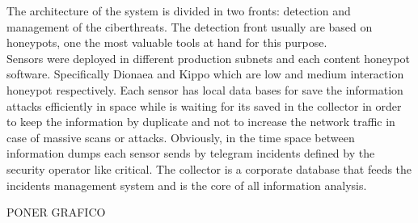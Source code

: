 \documentclass[a4paper]{llncs}
\begin{document}
	The architecture of the system is divided in two fronts: detection and management of the ciberthreats. The detection front usually are based on honeypots, one the most valuable tools at hand for this purpose.\\
	Sensors were deployed in different production subnets and each content honeypot software. Specifically Dionaea\cite{dionaea} and Kippo\cite{kippo} which are low and medium interaction honeypot respectively. 
	Each sensor has local data bases for save the information
	attacks efficiently in space 
	while is waiting 
	for its saved 
	in the collector in order to keep the information by duplicate and not to increase the network traffic in case of massive scans or attacks. Obviously, in the time space 
	between information dumps each sensor sends by telegram incidents
	defined by the security operator like critical. The collector is a corporate database that feeds the incidents management system 
	and is 
	the core of all information analysis.
	
	PONER GRAFICO
	
\end{document}
